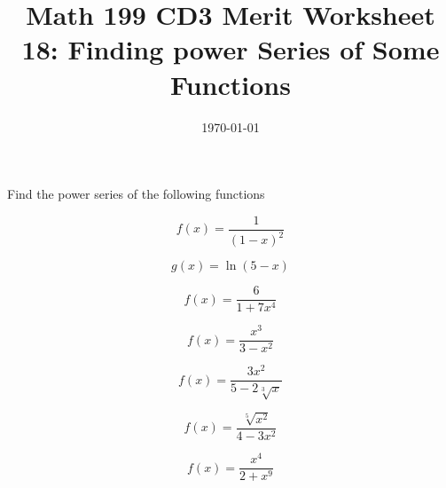 

\usepackage{fullpage,amsmath,amssymb,amsthm}

\newcommand{\D}{\displaystyle}

\title{Math 199 CD3 Merit Worksheet 18: Finding power Series of Some Functions}
\date{\today}




\maketitle
Find the power series of the following functions
\be

	\item $$f(x)=\frac{1}{(1-x)^2}$$
	\vfill
	\item $$g(x)=\ln(5-x)$$
	\vfill
	\item $$f(x)=\frac{6}{1+7x^4}$$
	\vfill
	\item $$f(x)=\frac{x^3}{3-x^2}$$
	\vfill \newpage

	\item $$f(x)=\frac{3x^2}{5-2\sqrt[3]x}$$\vfill

	\item $$f(x)=\frac{\sqrt[5]{x^2}}{4-3x^2}$$
	\vfill

	\item $$f(x)=\frac{x^4}{2+x^9}$$
	\vfill

\ee

